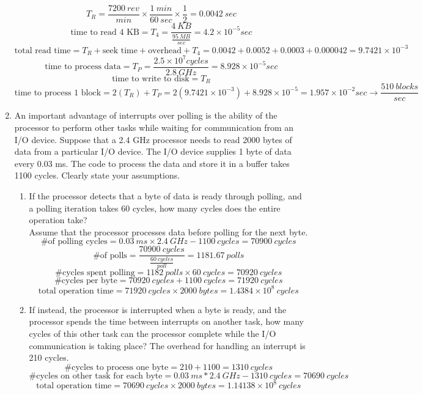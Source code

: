 \documentclass[10pt,letterpaper]{article}
\begin{document}
\begin{enumerate}[label=\textbf{Problem \arabic*.}]
\[T_R = \frac{7200 \ rev}{min} \times \frac{1 \  min}{60 \ sec} \times \frac{1}{2} = 0.0042 \ sec\]
\[\text{time to read 4 KB} = T_4 =  \frac{4 \ KB}{\frac{95 \ MB}{sec}} = 4.2 \times 10^{-5} sec\]
\[\text{total read time} = T_R + \text{seek time} + \text{overhead} + T_4 = 0.0042 + 0.0052 + 0.0003 + 0.000042 = 9.7421 \times 10^{-3}\]
\[\text{time to process data} = T_P = \frac{2.5 \times 10^7 cycles}{2.8 \ GHz} = 8.928 \times 10^{-5} sec\]
\[\text{time to write to disk} = T_R\]
\[\text{time to process 1 block} = 2(T_R) + T_P = 2(9.7421 \times 10^{-3}) + 8.928 \times 10^{-5} = 1.957 \times 10^{-2} sec \rightarrow \boxed{\frac{510 \ blocks}{sec}}\]
\item An important advantage of interrupts over polling is the ability of the processor to perform other tasks while waiting for communication from an I/O device. Suppose that a 2.4 GHz processor needs to read 2000 bytes of data from a particular I/O device. The I/O device supplies 1 byte of data every 0.03 ms. The code to process the data and store it in a buffer takes 1100 cycles. Clearly state your assumptions.
	\begin{enumerate}[label=\Alph*)]
	\item If the processor detects that a byte of data is ready through polling, and a polling iteration takes 60 cycles, how many cycles does the entire operation take?\\
	Assume that the processor processes data before polling for the next byte.
	\[\text{\# of polling cycles} = 0.03 \ ms \times 2.4 \ GHz - 1100 \ cycles = 70900 \ cycles\]
	\[\text{\# of polls} = \frac{70900 \ cycles}{\frac{60 \ cycles}{poll}} = 1181.67 \ polls\]
	\[\text{\# cycles spent polling} = 1182 \ polls \times 60 \ cycles = 70920 \ cycles\]
	\[\text{\# cycles per byte} = 70920 \ cycles + 1100 \ cycles = 71920 \ cycles\]
	\[\boxed{\text{total operation time} = 71920 \ cycles \times 2000 \ bytes = 1.4384 \times 10^8 \ cycles}\]
	\item If instead, the processor is interrupted when a byte is ready, and the processor spends the time between interrupts on another task, how many cycles of this other task can the processor complete while the I/O communication is taking place? The overhead for handling an interrupt is 210 cycles.
	\[\text{\# cycles to process one byte} = 210 + 1100 = 1310 \ cycles\]
	\[\text{\# cycles on other task for each byte} = 0.03 \ ms * 2.4 \ GHz - 1310 \ cycles = 70690 \ cycles\]
	\[\boxed{\text{total operation time} = 70690 \ cycles \times 2000 \ bytes = 1.14138 \times 10^8 \ cycles}\]

\end{enumerate}
\end{enumerate}
\end{document}
